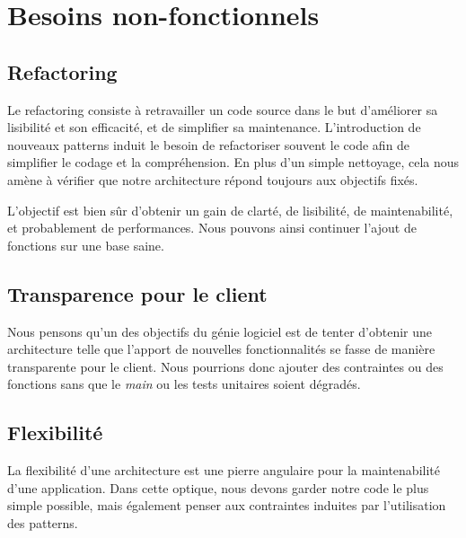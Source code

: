 \section{Besoins non-fonctionnels}

\subsection{Refactoring}\label{refactoring} 

Le refactoring consiste à retravailler un code source dans le but d'améliorer sa lisibilité et son efficacité, et de simplifier sa maintenance.
L'introduction de nouveaux patterns induit le besoin de refactoriser souvent le code afin de simplifier
le codage et la compréhension.
En plus d'un simple nettoyage, cela nous amène à vérifier que notre architecture répond toujours aux
objectifs fixés.

L'objectif est bien sûr d'obtenir un gain de clarté, de lisibilité, de maintenabilité, et probablement de performances. Nous pouvons ainsi continuer l'ajout de fonctions sur une base saine.

\subsection{Transparence pour le client}

Nous pensons qu'un des objectifs du génie logiciel est de tenter d'obtenir une architecture telle que l'apport
de nouvelles fonctionnalités se fasse de manière transparente pour le client. Nous pourrions donc ajouter des
contraintes ou des fonctions sans que le \emph{main} ou les tests unitaires soient dégradés.

\subsection{Flexibilité}

La flexibilité d'une architecture est une pierre angulaire pour la maintenabilité d'une application.
Dans cette optique, nous devons garder notre code le plus simple possible, mais également penser aux contraintes
induites par l'utilisation des patterns.